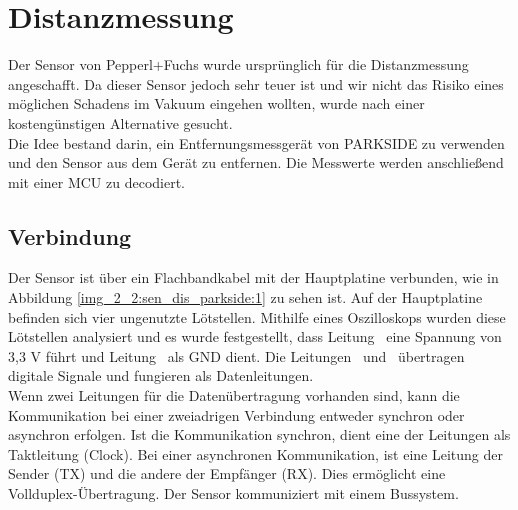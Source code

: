 \newpage
\section{Distanzmessung}



Der Sensor von Pepperl+Fuchs wurde ursprünglich für die Distanzmessung angeschafft. Da dieser Sensor jedoch sehr teuer ist und wir nicht das Risiko eines möglichen Schadens im Vakuum eingehen wollten, wurde nach einer kostengünstigen Alternative gesucht.\\
Die Idee bestand darin, ein Entfernungsmessgerät von PARKSIDE zu verwenden und den Sensor aus dem Gerät zu entfernen. Die Messwerte werden anschließend mit einer MCU zu decodiert.

\subsection{Verbindung}
Der Sensor ist über ein Flachbandkabel mit der Hauptplatine verbunden, wie in Abbildung \ref{img_2_2:sen_dis_parkside:1} zu sehen ist. Auf der Hauptplatine befinden sich vier ungenutzte Lötstellen. Mithilfe eines Oszilloskops wurden diese Lötstellen analysiert und es wurde festgestellt, dass Leitung \flqq\ eine Spannung von 3,3 V führt und Leitung \flqq\ als GND dient. Die Leitungen \flqq\ und \flqq\ übertragen digitale Signale und fungieren als Datenleitungen.\\
Wenn zwei Leitungen für die Datenübertragung vorhanden sind, kann die Kommunikation bei einer zweiadrigen Verbindung entweder synchron oder asynchron erfolgen. Ist die Kommunikation synchron, dient eine der Leitungen als Taktleitung (Clock). Bei einer asynchronen Kommunikation, ist eine Leitung der Sender (TX) und die andere der Empfänger (RX). Dies ermöglicht eine Vollduplex-Übertragung.
Der Sensor kommuniziert mit einem Bussystem.



